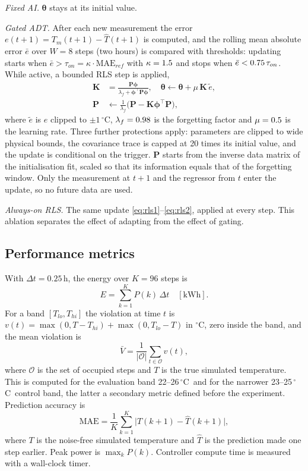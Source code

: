 \documentclass[conference]{IEEEtran}
\newcommand{\degC}{\ensuremath{^{\circ}}C}
\newcommand{\that}{\hat{T}}
\begin{document}
\emph{Fixed AI.} $\boldsymbol{\theta}$ stays at its initial value.

\emph{Gated ADT.} After each new measurement the error $e(t{+}1)=T_m(t{+}1)-\that(t{+}1)$ is computed, and the rolling mean absolute error $\bar e$ over $W=8$ steps (two hours) is compared with thresholds: updating starts when $\bar e>\tau_{on}=\kappa\cdot\mathrm{MAE}_{ref}$ with $\kappa=1.5$ and stops when $\bar e<0.75\,\tau_{on}$. While active, a bounded RLS step is applied,
\begin{align}
\mathbf{K}&=\frac{\mathbf{P}\boldsymbol{\phi}}{\lambda_f+\boldsymbol{\phi}^{\top}\mathbf{P}\boldsymbol{\phi}},\quad
\boldsymbol{\theta}\leftarrow\boldsymbol{\theta}+\mu\,\mathbf{K}\,\tilde e,\label{eq:rls1}\\
\mathbf{P}&\leftarrow\frac{1}{\lambda_f}\big(\mathbf{P}-\mathbf{K}\boldsymbol{\phi}^{\top}\mathbf{P}\big),\label{eq:rls2}
\end{align}
where $\tilde e$ is $e$ clipped to $\pm1$\,\degC, $\lambda_f=0.98$ is the forgetting factor and $\mu=0.5$ is the learning rate. Three further protections apply: parameters are clipped to wide physical bounds, the covariance trace is capped at 20 times its initial value, and the update is conditional on the trigger. $\mathbf{P}$ starts from the inverse data matrix of the initialisation fit, scaled so that its information equals that of the forgetting window. Only the measurement at $t{+}1$ and the regressor from $t$ enter the update, so no future data are used.

\emph{Always-on RLS.} The same update \eqref{eq:rls1}--\eqref{eq:rls2}, applied at every step. This ablation separates the effect of adapting from the effect of gating.

\subsection{Performance metrics}
With $\Delta t=0.25$\,h, the energy over $K=96$ steps is
\begin{equation}
E=\sum_{k=1}^{K}P(k)\,\Delta t\quad[\mathrm{kWh}].
\label{eq:energy}
\end{equation}
For a band $[T_{lo},T_{hi}]$ the violation at time $t$ is $v(t)=\max(0,T-T_{hi})+\max(0,T_{lo}-T)$ in \degC, zero inside the band, and the mean violation is
\begin{equation}
\bar V=\frac{1}{|\mathcal{O}|}\sum_{t\in\mathcal{O}}v(t),
\label{eq:viol}
\end{equation}
where $\mathcal{O}$ is the set of occupied steps and $T$ is the true simulated temperature. This is computed for the evaluation band 22--26\,\degC\ and for the narrower 23--25\,\degC\ control band, the latter a secondary metric defined before the experiment. Prediction accuracy is
\begin{equation}
\mathrm{MAE}=\frac{1}{K}\sum_{k=1}^{K}\big|T(k{+}1)-\that(k{+}1)\big|,
\label{eq:mae}
\end{equation}
where $T$ is the noise-free simulated temperature and $\that$ is the prediction made one step earlier. Peak power is $\max_k P(k)$. Controller compute time is measured with a wall-clock timer.
\end{document}
